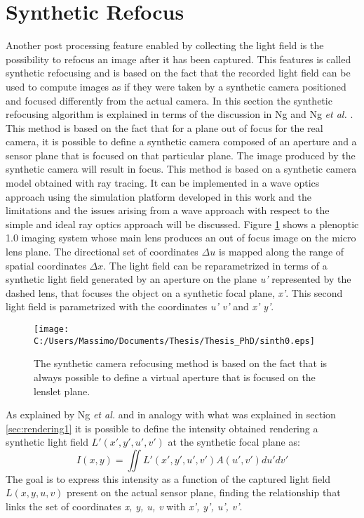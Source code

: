  \section{Synthetic Refocus}
 \label{sec:refocus10}
Another post processing feature enabled by collecting the light field is the possibility to refocus an image after it has been captured. This features is called synthetic refocusing and is based on the fact that the recorded light field can be used to compute images as if they were taken by a synthetic camera positioned and focused differently from the actual camera. In this section the synthetic refocusing algorithm is explained in terms of the discussion in Ng \cite{ng2006digital} and Ng \textit{et al.} \cite{ng2005light}. \\
This method is based on the fact that for a plane out of focus for the real camera, it is possible to define a synthetic camera composed of an aperture and a sensor plane that is focused on that particular plane. The image produced by the synthetic camera will result in focus. This method is based on a synthetic camera model obtained with ray tracing. It can be implemented in a wave optics approach using the simulation platform developed in this work and the limitations and the issues arising from a wave approach with respect to the simple and ideal ray optics approach will be discussed. 
 Figure  \ref{fig:synthetic0} shows a plenoptic 1.0 imaging system whose main lens produces an out of focus image on the micro lens plane. The directional set of coordinates $\Delta u$ is mapped along the range of spatial coordinates $\Delta x$. The light field can be reparametrized in terms of a synthetic light field generated by an aperture on the plane \textit{u'} represented by the dashed lens, that focuses the object on a synthetic focal plane, \textit{x'}. This second light field is parametrized with the coordinates \textit{u' v'} and \textit{x' y'}. 
 \newpage
 \begin{figure}[H]
 	\centering
 	\texttt{[image: C:/Users/Massimo/Documents/Thesis/Thesis\_PhD/sinth0.eps]}
 	\caption{\label{fig:synthetic0} The synthetic camera refocusing method is based on the fact that is always possible to define a virtual aperture that is focused on the lenslet plane. }
 \end{figure}
 As explained by Ng \textit{et al.} \cite{ng2005light} and in analogy with what was explained in section \ref{sec:rendering1} it is possible to define the intensity obtained rendering a synthetic light field $L'(x',y', u', v') $ at the synthetic focal plane as:
 \begin{equation}
 \label{eq:sinth1}
 I(x,y)=\iint L'(x',y',u',v')A(u',v') du'dv'
 \end{equation}
 The goal is to express this intensity as a function of the captured light field $L(x,y,u,v)$ present on the actual sensor plane, finding the relationship that links the set of coordinates \textit{x, y, u, v} with \textit{x', y', u', v'}. 
 \newpage
